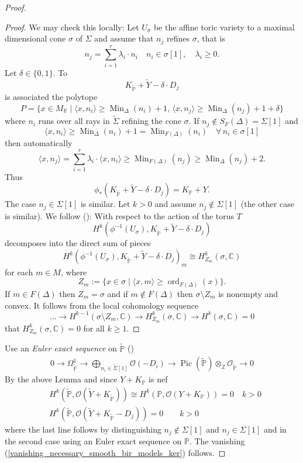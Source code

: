 \documentclass[12pt, english]{article}
\DeclareMathOperator{\ord}{ord}
\DeclareMathOperator{\Pic}{Pic}
\DeclareMathOperator{\Min}{Min}
\begin{document}
\begin{proof}
	\begin{proof}
		We may check this locally: Let $U_{\sigma}$ be the affine toric variety to a maximal dimensional cone $\sigma$ of $\Sigma$ and assume that $n_j$ refines $\sigma$, that is
		\[ n_j = \sum\limits_{i = 1}^r \lambda_i \cdot n_i \quad n_i \in \sigma[1], \quad \lambda_i \geq 0.  \]
		Let $\delta \in \{0,1\}$. To 
		\[ K_{\tilde{\mathbb{P}}} + \tilde{Y} - \delta \cdot D_j  \]
		is associated the polytope
		\[ P= \{ x \in M_{\mathbb{R}} \mid \langle x,n_i \rangle \geq \Min_{\Delta}(n_i)+1, \, \langle x,n_j \rangle \geq \Min_{\Delta}(n_j)+1 + \delta   \}  \]
		where $n_i$ runs over all rays in $\tilde{\Sigma}$ refining the cone $\sigma$. If $n_j \notin S_F(\Delta) = \Sigma[1]$ and
		\[ \langle x,n_i \rangle \geq \Min_{\Delta}(n_i) + 1 = \Min_{F(\Delta)}(n_i)  \quad \forall \, n_i \in \sigma[1] \]
		then automatically
		\[ \langle x, n_j \rangle = \sum\limits_{i=1}^r \lambda_i \cdot \langle x, n_i \rangle \geq \Min_{F(\Delta)}(n_j) \geq \Min_{\Delta}(n_j) + 2.  \]
		Thus 
		\[ \phi_*(K_{\tilde{\mathbb{P}}} + \tilde{Y} - \delta \cdot D_j) = K_{\mathbb{P}} + Y.  \]
		The case $n_j \in \Sigma[1]$ is similar. Let $k>0$ and assume $n_j \notin \Sigma[1]$ (the other case is similar). We follow (\cite[§7,§8]{Dan78}): With respect to the action of the torus $T$
		\[ H^k(\phi^{-1}(U_{\sigma}), K_{\tilde{\mathbb{P}}} + \tilde{Y} - \delta \cdot D_j)  \]
		decomposes into the direct sum of pieces 
		\[ H^k(\phi^{-1}(U_{\sigma}), K_{\tilde{\mathbb{P}}} + \tilde{Y} - \delta \cdot D_j)_m \cong H_{Z_m}^k(\sigma, \mathbb{C})  \]
		for each $m \in M$, where
		\[ Z_m := \{ x \in \sigma \mid \langle x, m \rangle \geq \ord_{F(\Delta)}(x)  \}.  \]
		If $m \in F(\Delta)$ then $Z_m = \sigma$ and if $m \notin F(\Delta)$ then $\sigma \setminus Z_m$ is nonempty and convex. It follows from the local cohomology sequence
		\[ ... \rightarrow H^{k-1}(\sigma \setminus Z_m, \mathbb{C}) \rightarrow H_{Z_m}^k(\sigma, \mathbb{C}) \rightarrow H^k(\sigma, \mathbb{C}) = 0 \]
		that $H_{Z_m}^k(\sigma, \mathbb{C}) = 0$ for all $k \geq 1$.
	\end{proof}
	
	Use an \textit{Euler exact sequence} on $\tilde{\mathbb{P}}$ (\cite[Thm.8.1.6]{CLS11})
	\begin{align*}
		0 \rightarrow \Omega_{\tilde{\mathbb{P}}}^1 \rightarrow \bigoplus\limits_{n_i \in \tilde{\Sigma}[1]} \mathcal{O}(-D_i) \rightarrow \Pic(\tilde{\mathbb{P}}) \otimes_{\mathbb{Z}} \mathcal{O}_{\tilde{\mathbb{P}}} \rightarrow 0
	\end{align*}
	By the above Lemma and since $Y+K_{\mathbb{P}}$ is nef
	\begin{align*}
		& H^k(\tilde{\mathbb{P}}, \mathcal{O}(\tilde{Y} + K_{\tilde{\mathbb{P}}})) \cong H^k(\mathbb{P}, \mathcal{O}(Y+K_{\mathbb{P}})) = 0 \quad k > 0 \\
		& H^k(\tilde{\mathbb{P}}, \mathcal{O}(\tilde{Y} + K_{\tilde{\mathbb{P}}} - D_j)) = 0 \quad \quad k > 0
	\end{align*}
	where the last line follows by distinguishing $n_j \notin \Sigma[1]$ and $n_j \in \Sigma[1]$ and in the second case using an Euler exact sequence on $\mathbb{P}$. The vanishing (\ref{vanishing_necessary_smooth_bir_models_ker}) follows.
	

\end{proof}
\end{document}
